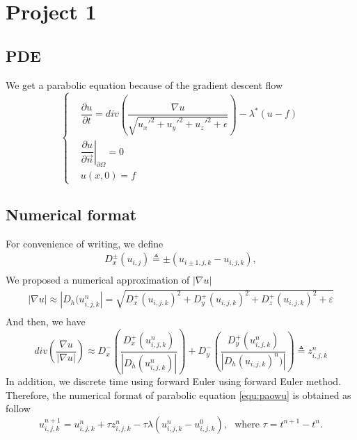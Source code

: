 \documentclass{article}
\begin{document}
\section{Project 1}
\subsection{PDE}
We get a parabolic equation because of the gradient descent flow
\begin{equation}\label{equ:paowu}
  \left\{
  \begin{split}
    &\dfrac{\partial u}{\partial t}=div\left (\dfrac{\nabla u}{\sqrt{u_x'^2+u_y'^2+u_z'^2+\epsilon}}\right)-\lambda^*(u-f) \\
    &\left. \dfrac{\partial u}{\partial \overrightarrow{n}} \right | _{\partial \Omega} =0\\
    &u(x,0)=f
  \end{split}
  \right.
\end{equation}


\subsection{Numerical format}
For convenience of writing, we define
\begin{equation*}
  \begin{array}{c}
      D_x^{\pm}(u_{i,j}) \triangleq \pm (u_{i\pm1,j,k}-u_{i,j,k}),\\
   \end{array}
\end{equation*}
We proposed a numerical approximation of $|\nabla u|$
\begin{equation*}
  \begin{array}{c}
    |\nabla u|\approx  |D_h(u_{i,j,k}^n| =  \sqrt{D_x ^+ (u_{i,j,k})^2+D_y^+(u_{i,j,k})^2+D_z^+(u_{i,j,k})^2+\varepsilon}\\
  \end{array}
\end{equation*}
And then, we have
\begin{equation}\label{equ:div1}
  div\left (\frac{\nabla u}{|\nabla u|}\right) \approx D_x^-\left(\frac{D_x^+(u_{i,j,k}^n)}{|D_h(u_{i,j,k}^n)|}\right)+D_y^-
  \left(\frac{D_y^+(u_{i,j,k}^n)}{|D_h(u_{i,j,k})^n)|}\right) \triangleq z_{i,j,k}^n
\end{equation}
In addition, we discrete time using forward Euler using forward Euler method. Therefore, the numerical format of parabolic equation \eqref{equ:paowu} is obtained as follow
\begin{equation}\label{equ:shuzhi1}
  u_{i,j,k}^{n+1}=u_{i,j,k}^n +\tau z_{i,j,k}^n-\tau \lambda (u_{i,j,k}^n-u_{i,j,k}^0),\ \ \ \text{where }\tau = t^{n+1}-t^n.
\end{equation}
\end{document}
